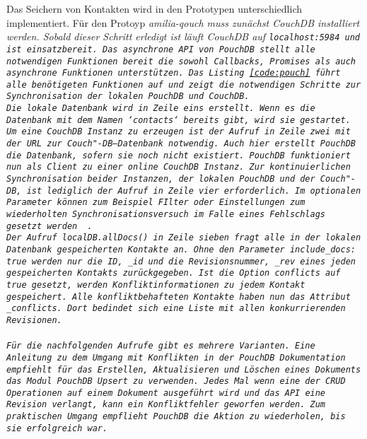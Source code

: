 Das Seichern von Kontakten wird in den Prototypen unterschiedlich implementiert.
%
%
Für den Protoyp \it{amilia-qouch} muss zunächst CouchDB installiert werden.
Sobald dieser Schritt erledigt ist läuft CouchDB auf \tt{localhost:5984} und ist einsatzbereit.
Das asynchrone \gls{API} von PouchDB stellt alle notwendigen Funktionen bereit die sowohl Callbacks, Promises als auch asynchrone Funktionen unterstützen. 
Das Listing \ref{code:pouch} führt alle benötigeten Funktionen auf und zeigt die notwendigen Schritte zur Synchronisation der lokalen PouchDB und CouchDB.\\
Die lokale Datenbank wird in Zeile eins erstellt. Wenn es die Datenbank mit dem Namen `contacts` bereits gibt, wird sie gestartet.\\
Um eine CouchDB Instanz zu erzeugen ist der Aufruf in Zeile zwei mit der URL zur Couch"-DB--Datenbank notwendig. Auch hier erstellt PouchDB die Datenbank, sofern sie noch nicht existiert. PouchDB funktioniert nun als Client zu einer online CouchDB Instanz.
Zur kontinuierlichen Synchronisation beider Instanzen, der lokalen PouchDB und der Couch"-DB, ist lediglich der Aufruf in Zeile vier erforderlich. Im optionalen Parameter können zum Beispiel FIlter oder Einstellungen zum wiederholten Synchronisationsversuch im Falle eines Fehlschlags gesetzt werden ~\cite{pouch_options}.\\
Der Aufruf \tt{localDB.allDocs()} in Zeile sieben fragt alle in der lokalen Datenbank gespeicherten Kontakte an.
Ohne den Parameter \tt{include\_docs: true} werden nur die ID, \tt{\_id} und die Revisionsnummer, \tt{\_rev} eines jeden gespeicherten Kontakts zurückgegeben.
Ist die Option \tt{conflicts} auf \tt{true} gesetzt, werden Konfliktinformationen zu jedem Kontakt gespeichert. Alle konfliktbehafteten Kontakte haben nun das Attribut \tt{\_conflicts}. Dort bedindet sich eine Liste mit allen konkurrierenden Revisionen.\\\\
%
Für die nachfolgenden Aufrufe gibt es mehrere Varianten. Eine Anleitung zu dem Umgang mit Konflikten in der PouchDB Dokumentation empfiehlt für das Erstellen, Aktualisieren und Löschen eines Dokuments das Modul PouchDB Upsert zu verwenden. Jedes Mal wenn eine der \gls{CRUD} Operationen auf einem Dokument ausgeführt wird und das \gls{API} eine Revision verlangt, kann ein Konfliktfehler geworfen werden. Zum praktischen Umgang empflieht PouchDB die Aktion zu wiederholen, bis sie erfolgreich war.
